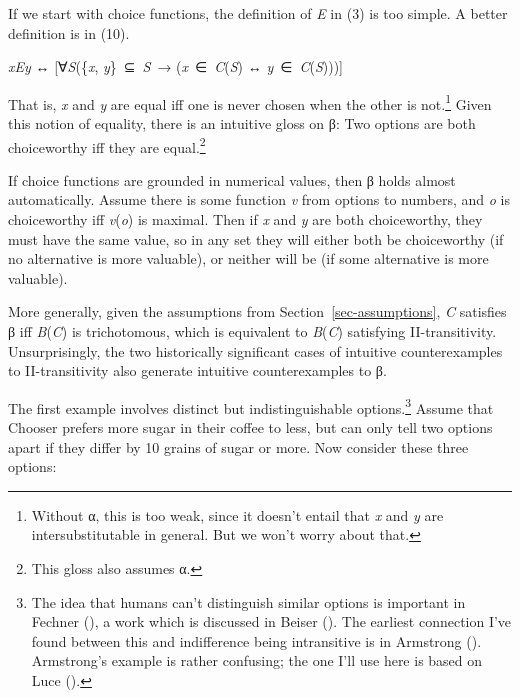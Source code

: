 \documentclass[
  10.5pt,
  twoside]{article}
\providecommand{\tightlist}{%
  \setlength{\itemsep}{0pt}\setlength{\parskip}{0pt}}
\let\oldenumerate\enumerate
\let\endoldenumerate\endenumerate
\renewenvironment{enumerate}
  {\vskip 5pt\oldenumerate}
  {\endoldenumerate\vskip 5pt}
\begin{document}
If we start with choice functions, the definition of \emph{E} in (3) is
too simple. A better definition is in (10).

\begin{enumerate}
\def\labelenumi{(\arabic{enumi})}
\setcounter{enumi}{9}
\tightlist
\item
  \emph{xEy} ↔ {[}∀\emph{S}(\{\emph{x}, \emph{y}\}~⊆~\emph{S}~→
  (\emph{x}~∈~\emph{C}(\emph{S}) ↔ \emph{y}~∈~\emph{C}(\emph{S}))){]}
\end{enumerate}

That is, \emph{x} and \emph{y} are equal iff one is never chosen when
the other is not.\footnote{Without α, this is too weak, since it doesn't
  entail that \emph{x} and \emph{y} are intersubstitutable in general.
  But we won't worry about that.} Given this notion of equality, there
is an intuitive gloss on β: Two options are both choiceworthy iff they
are equal.\footnote{This gloss also assumes α.}

If choice functions are grounded in numerical values, then β holds
almost automatically. Assume there is some function \emph{v} from
options to numbers, and \emph{o} is choiceworthy iff \emph{v}(\emph{o})
is maximal. Then if \emph{x} and \emph{y} are both choiceworthy, they
must have the same value, so in any set they will either both be
choiceworthy (if no alternative is more valuable), or neither will be
(if some alternative is more valuable).

More generally, given the assumptions from
Section~\ref{sec-assumptions}, \emph{C} satisfies β iff
\emph{B}(\emph{C}) is trichotomous, which is equivalent to
\emph{B}(\emph{C}) satisfying II-transitivity. Unsurprisingly, the two
historically significant cases of intuitive counterexamples to
II-transitivity also generate intuitive counterexamples to β.

The first example involves distinct but indistinguishable
options.\footnote{The idea that humans can't distinguish similar options
  is important in Fechner (), a work
  which is discussed in Beiser (). The
  earliest connection I've found between this and indifference being
  intransitive is in Armstrong ().
  Armstrong's example is rather confusing; the one I'll use here is
  based on Luce ().} Assume that Chooser
prefers more sugar in their coffee to less, but can only tell two
options apart if they differ by 10 grains of sugar or more. Now consider
these three options:
\end{document}
